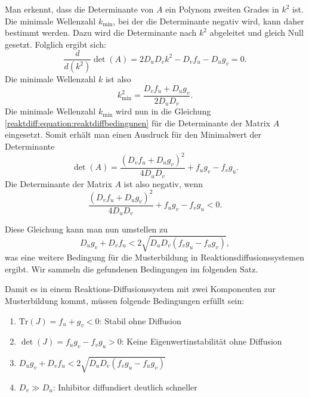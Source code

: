 Man erkennt, dass die Determinante von \(A\) ein Polynom zweiten Grades in \(k^2\) ist.  
Die minimale Wellenzahl \(k_{\text{min}}\), bei der die Determinante negativ wird, kann daher bestimmt werden.  
Dazu wird die Determinante nach \(k^2\) abgeleitet und gleich Null gesetzt.  
Folglich ergibt sich:
\begin{equation*}
    \frac{d}{d \left(k^2\right)} \det(A) = 2 D_u D_v k^2 - D_v f_u - D_u g_v = 0.
\end{equation*}
Die minimale Wellenzahl \(k\) ist also
\begin{equation*}
    k^2_{\text{min}} = \frac{D_v f_u + D_u g_v}{2 D_u D_v}.
\end{equation*}
Die minimale Wellenzahl \(k_{\text{min}}\) wird nun in die Gleichung \eqref{reaktdiff:equation:reaktdiffbedingunen} für die Determinante der Matrix \(A\) eingesetzt.
Somit erhält man einen Ausdruck für den Minimalwert der Determinante
\begin{equation*}
    \det(A) = \frac{(D_v f_u + D_u g_v)^2}{4 D_u D_v} + f_u g_v - f_v g_u.
\end{equation*}
Die Determinante der Matrix \(A\) ist also negativ, wenn
\begin{equation*}
    \frac{(D_v f_u + D_u g_v)^2}{4 D_u D_v} + f_u g_v - f_v g_u < 0.
\end{equation*}

Diese Gleichung kann man nun umstellen zu
\begin{equation*}
    D_u g_v+D_v f_u < 2\!\sqrt{D_u D_v(f_v g_u - f_u g_v)} ,
\end{equation*}
was eine weitere Bedingung für die Musterbildung in Reaktionsdiffusionssystemen ergibt.
Wir sammeln die gefundenen Bedingungen im folgenden Satz.
\begin{satz}
\label{reaktdiff:satz:bedingungen}
Damit es in einem Reaktions-Diffusionssystem mit zwei Komponenten zur Musterbildung kommt, müssen folgende Bedingungen erfüllt sein:
\begin{enumerate}
    \item \(\text{Tr}(J) = f_u + g_v < 0\): Stabil ohne Diffusion
    \item \(\det(J) = f_u g_v - f_v g_u > 0\): Keine Eigenwertinstabilität ohne Diffusion
    \item \(D_u g_v+D_v f_u < 2\!\sqrt{D_u D_v(f_v g_u - f_u g_v)}\)
    \item \(D_v \gg D_u\): Inhibitor diffundiert deutlich schneller
\end{enumerate}
\end{satz}

